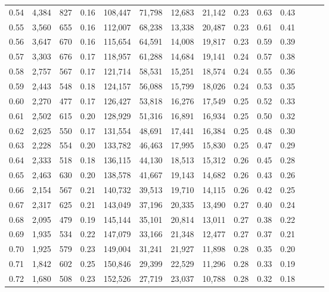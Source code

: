 \begin{tabular}{rrrrrrrrrrrrrr}
0.54 &  4,384 &  827 &  0.16 &  108,447 &   71,798 &  12,683 &  21,142 &  0.23 &  0.63 &      0.43 \\
0.55 &  3,560 &  655 &  0.16 &  112,007 &   68,238 &  13,338 &  20,487 &  0.23 &  0.61 &      0.41 \\
0.56 &  3,647 &  670 &  0.16 &  115,654 &   64,591 &  14,008 &  19,817 &  0.23 &  0.59 &      0.39 \\
0.57 &  3,303 &  676 &  0.17 &  118,957 &   61,288 &  14,684 &  19,141 &  0.24 &  0.57 &      0.38 \\
0.58 &  2,757 &  567 &  0.17 &  121,714 &   58,531 &  15,251 &  18,574 &  0.24 &  0.55 &      0.36 \\
0.59 &  2,443 &  548 &  0.18 &  124,157 &   56,088 &  15,799 &  18,026 &  0.24 &  0.53 &      0.35 \\
0.60 &  2,270 &  477 &  0.17 &  126,427 &   53,818 &  16,276 &  17,549 &  0.25 &  0.52 &      0.33 \\
0.61 &  2,502 &  615 &  0.20 &  128,929 &   51,316 &  16,891 &  16,934 &  0.25 &  0.50 &      0.32 \\
0.62 &  2,625 &  550 &  0.17 &  131,554 &   48,691 &  17,441 &  16,384 &  0.25 &  0.48 &      0.30 \\
0.63 &  2,228 &  554 &  0.20 &  133,782 &   46,463 &  17,995 &  15,830 &  0.25 &  0.47 &      0.29 \\
0.64 &  2,333 &  518 &  0.18 &  136,115 &   44,130 &  18,513 &  15,312 &  0.26 &  0.45 &      0.28 \\
0.65 &  2,463 &  630 &  0.20 &  138,578 &   41,667 &  19,143 &  14,682 &  0.26 &  0.43 &      0.26 \\
0.66 &  2,154 &  567 &  0.21 &  140,732 &   39,513 &  19,710 &  14,115 &  0.26 &  0.42 &      0.25 \\
0.67 &  2,317 &  625 &  0.21 &  143,049 &   37,196 &  20,335 &  13,490 &  0.27 &  0.40 &      0.24 \\
0.68 &  2,095 &  479 &  0.19 &  145,144 &   35,101 &  20,814 &  13,011 &  0.27 &  0.38 &      0.22 \\
0.69 &  1,935 &  534 &  0.22 &  147,079 &   33,166 &  21,348 &  12,477 &  0.27 &  0.37 &      0.21 \\
0.70 &  1,925 &  579 &  0.23 &  149,004 &   31,241 &  21,927 &  11,898 &  0.28 &  0.35 &      0.20 \\
0.71 &  1,842 &  602 &  0.25 &  150,846 &   29,399 &  22,529 &  11,296 &  0.28 &  0.33 &      0.19 \\
0.72 &  1,680 &  508 &  0.23 &  152,526 &   27,719 &  23,037 &  10,788 &  0.28 &  0.32 &      0.18 \\

\end{tabular}
